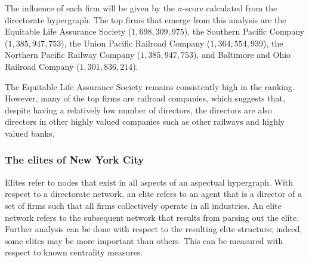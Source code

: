 The influence of each firm will be given by the $\sigma$-score calculated from the directorate hypergraph. The top firms that emerge from this analysis are the Equitable Life Assurance Society ($1,698,309,975$), the Southern Pacific Company ($1,385,947,753$), the Union Pacific Railroad Company ($1,364,554,939$), the Northern Pacific Railway Company ($1,385,947,753$), and Baltimore and Ohio Railroad Company ($1,301,836,214$).

The Equitable Life Assurance Society remains consistently high in the ranking. However, many of the top firms are railroad companies, which suggests that, despite having a relatively low number of directors, the directors are also directors in other highly valued companies such as other railways and highly valued banks.

\subsubsection*{The elites of New York City}

Elites refer to nodes that exist in all aspects of an aspectual hypergraph. With respect to a directorate network, an elite refers to an agent that is a director of a set of firms such that all firms collectively operate in all industries. An elite network refers to the subsequent network that results from parsing out the elite. Further analysis can be done with respect to the resulting elite structure; indeed, some elites may be more important than others. This can be measured with respect to known centrality measures.

